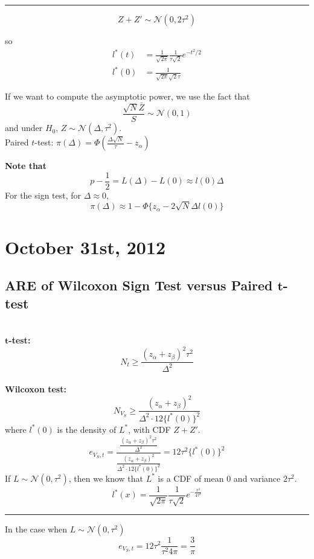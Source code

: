 \documentclass[a4paper,12pt]{amsart}
\begin{document}
\bigskip \hrule \bigskip

\[Z + Z' \sim \mathcal{N}(0,2 \tau^2)\]

so
\begin{align*}
l^*(t) &= \frac{1}{\sqrt{2\pi}}\frac{1}{\tau \sqrt{2}}e^{-t^2/2}\\
l^*(0) &= \frac{1}{\sqrt{2\pi}\sqrt{2} \tau}
\end{align*}

If we want to compute the asymptotic power, we use the fact that
\[\frac{\sqrt{N} \bar{Z}}{S} \sim \mathcal{N}(0,1)\]
and under $H_0$, $Z \sim \mathcal{N}(\Delta,\tau^2)$.\\
Paired $t$-test: $\pi(\Delta) = \Phi\left(\frac{\Delta \sqrt{N}}{\tau} - z_\alpha\right)$

\noindent
\textbf{Note that}
\[p - \frac{1}{2} = L(\Delta) - L(0) \approx l(0) \Delta\]
For the sign test, for $\Delta \approx 0$,
\[\pi(\Delta) \approx 1 - \Phi\{z_\alpha - 2\sqrt{N}\Delta l(0)\}\]


\section{October 31st, 2012}
\subsection{ARE of Wilcoxon Sign Test versus Paired $\boldsymbol t$-test}
\quad\\
\textbf{$\boldsymbol t$-test: }
\[N_t \geq \frac{(z_\alpha + z_\beta)^2 \tau^2}{\Delta^2}\]\\
\textbf{Wilcoxon test:} 
\[N_{V_S} \geq \frac{(z_\alpha + z_\beta)^2}{\Delta^2 \cdot 12 \{l^*(0)\}^2}\]
where $l^*(0)$ is the density of $L^*$, with CDF $Z + Z'$. 
\[e_{V_S,t} = \frac{\frac{(z_\alpha + z_\beta)^2 \tau^2}{\Delta^2}}{\frac{(z_\alpha + z_\beta)^2}{\Delta^2 \cdot 12 \{l^*(0)\}^2}} = 12 \tau^2 \{l^*(0)\}^2\]
If $L \sim \mathcal{N}(0,\tau^2)$, then we know that $L^*$ is a CDF of mean $0$ and variance $2\tau^2$.
\[l^*(x) = \frac{1}{\sqrt{2\pi}} \frac{1}{\tau \sqrt{2}} e^{-\frac{x^2}{4\tau^2}}\]
\hrule \bigskip 	
In the case when $L \sim \mathcal{N}(0,\tau^2)$
\[e_{V_S,t} = 12 \tau^2 \frac{1}{\tau^2 4 \pi} = \frac{3}{\pi}\]
\end{document}
